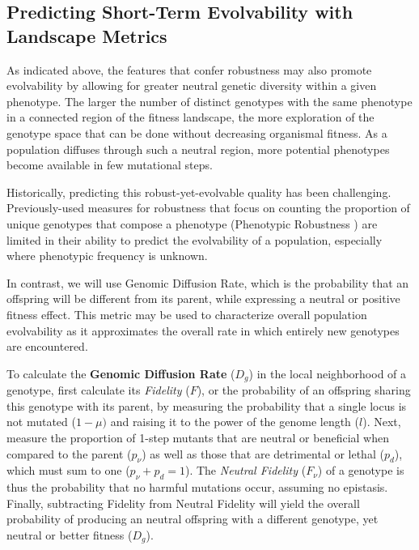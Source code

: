 \documentclass[PhD]{msu-thesis}
\begin{document}
\subsection{Predicting Short-Term Evolvability with Landscape Metrics}

As indicated above, the features that confer robustness may also promote evolvability by allowing for greater neutral genetic diversity within a given phenotype. The larger the number of distinct genotypes with the same phenotype in a connected region of the fitness landscape, the more exploration of the genotype space that can be done without decreasing organismal fitness. As a population diffuses through such a neutral region, more potential phenotypes become available in few mutational steps\cite{andreas_wagner_robustness_2005}.

Historically, predicting this robust-yet-evolvable quality has been challenging. Previously-used measures for robustness that focus on counting the proportion of unique genotypes that compose a phenotype (Phenotypic Robustness \cite{andreas_wagner_robustness_2008}) are limited in their ability to predict the evolvability of a population, especially where phenotypic frequency is unknown. 

In contrast, we will use Genomic Diffusion Rate, which is the probability that an offspring will be different from its parent, while expressing a neutral or positive fitness effect. This metric may be used to characterize overall population evolvability as it approximates the overall rate in which entirely new genotypes are encountered\cite{ofria_evolution_2002}. 

To calculate the \textbf{Genomic Diffusion Rate} ($D_g$) in the local neighborhood of a genotype, first calculate its \textit{Fidelity} ($F$), or the probability of an offspring sharing this genotype with its parent, by measuring the probability that a single locus is not mutated ($1-\mu)$ and raising it to the power of the genome length ($l$). Next, measure the proportion of 1-step mutants that are neutral or beneficial when compared to the parent ($p_\nu$) as well as those that are detrimental or lethal ($p_d$), which must sum to one ($p_\nu + p_d = 1$).  The \textit{Neutral Fidelity} ($F_\nu$) of a genotype is thus the probability that no harmful mutations occur, assuming no epistasis. Finally, subtracting Fidelity from Neutral Fidelity will yield the overall probability of producing an neutral offspring with a different genotype, yet neutral or better fitness ($D_g$).
\end{document}
